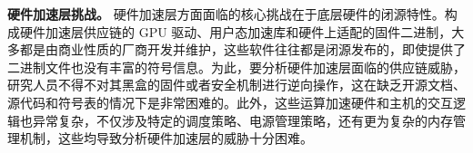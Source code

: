 \textbf{硬件加速层挑战。}
硬件加速层方面面临的核心挑战在于底层硬件的闭源特性。构成硬件加速层供应链的 GPU 驱动、用户态加速库和硬件上适配的固件二进制，大多都是由商业性质的厂商开发并维护，这些软件往往都是闭源发布的，即使提供了二进制文件也没有丰富的符号信息。为此，要分析硬件加速层面临的供应链威胁，研究人员不得不对其黑盒的固件或者安全机制进行逆向操作，这在缺乏开源文档、源代码和符号表的情况下是非常困难的。此外，这些运算加速硬件和主机的交互逻辑也异常复杂，不仅涉及特定的调度策略、电源管理策略，还有更为复杂的内存管理机制，这些均导致分析硬件加速层的威胁十分困难。




